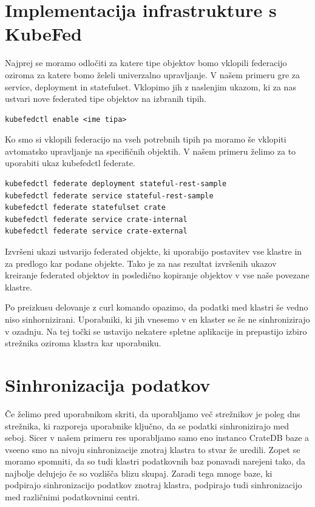\documentclass[a4paper, 12pt]{book}
\begin{document}
\section{Implementacija infrastrukture s KubeFed}
Najprej se moramo odločiti za katere tipe objektov bomo vklopili federacijo oziroma za katere bomo želeli univerzalno upravljanje.
V našem primeru gre za service, deployment in statefulset. Vklopimo jih z naslenjim ukazom, ki za nas ustvari nove federated tipe objektov na izbranih tipih.
\begin{verbatim}
kubefedctl enable <ime tipa>
\end{verbatim}
Ko smo si vklopili federacijo na vseh potrebnih tipih pa moramo še vklopiti avtomatsko upravljanje na specifičnih objektih.
V našem primeru želimo za to uporabiti ukaz kubefedctl federate.
\begin{verbatim}
kubefedctl federate deployment stateful-rest-sample
kubefedctl federate service stateful-rest-sample
kubefedctl federate statefulset crate
kubefedctl federate service crate-internal
kubefedctl federate service crate-external
\end{verbatim}
Izvršeni ukazi ustvarijo federated objekte, ki uporabijo postavitev vse klastre in za predlogo kar podane objekte.
Tako je za nas rezultat izvršenih ukazov kreiranje federated objektov in posledično kopiranje objektov v vse naše povezane klastre.

Po preizkusu delovanje z curl komando opazimo, da podatki med klastri še vedno niso sinhornizirani.
Uporabniki, ki jih vnesemo v en klaster se še ne sinhronizirajo v ozadnju.
Na tej točki se ustavijo nekatere spletne aplikacije in prepustijo izbiro strežnika oziroma klastra kar uporabniku.
\section{Sinhronizacija podatkov}
Če želimo pred uporabnikom skriti, da uporabljamo več strežnikov je poleg dns strežnika, ki razporeja uporabnike ključno, da se podatki sinhronizirajo med seboj.
Sicer v našem primeru res uporabljamo samo eno instanco CrateDB baze a vseeno smo na nivoju sinhronizacije znotraj klastra to stvar že uredili. 
Zopet se moramo spomniti, da so tudi klastri podatkovnih baz ponavadi narejeni tako, da najbolje delujejo če so vozlišča blizu skupaj.
Zaradi tega mnoge baze, ki podpirajo sinhronizacijo podatkov znotraj klastra, podpirajo tudi sinhronizacijo med različnimi podatkovnimi centri.
\end{document}
